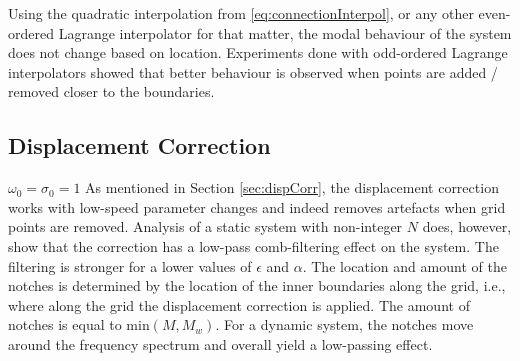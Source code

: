 Using the quadratic interpolation from \eqref{eq:connectionInterpol}, or any other even-ordered Lagrange interpolator for that matter, the modal behaviour of the system does not change based on location. Experiments done with odd-ordered Lagrange interpolators showed that better behaviour is observed when points are added / removed closer to the boundaries. 

\subsection{Displacement Correction}\label{sec:dispCorrRes}
$\omega_0 = \sigma_0 = 1$
As mentioned in Section \ref{sec:dispCorr}, the displacement correction works with low-speed parameter changes and indeed removes artefacts when grid points are removed. Analysis of a static system with non-integer $N$ does, however, show that the correction has a low-pass comb-filtering effect on the system. The filtering is stronger for a lower values of $\epsilon$ and $\alpha$. The location and amount of the notches is determined by the location of the inner boundaries along the grid, i.e., where along the grid the displacement correction is applied. The amount of notches is equal to $\text{min}(M, M_w)$.
For a dynamic system, the notches move around the frequency spectrum and overall yield a low-passing effect.


